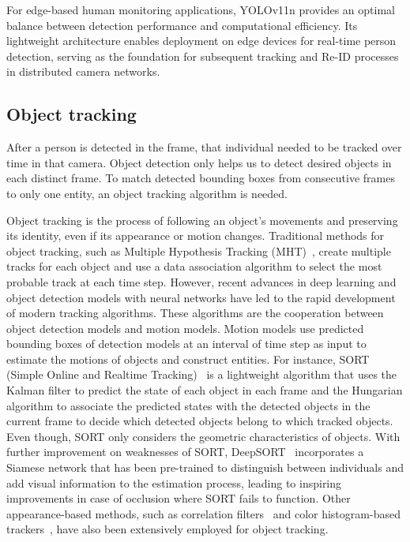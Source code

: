\documentclass[../main.tex]{subfiles}
\begin{document}
For edge-based human monitoring applications, YOLOv11n provides an optimal balance between detection performance and computational efficiency. Its lightweight architecture enables deployment on edge devices for real-time person detection, serving as the foundation for subsequent tracking and Re-ID processes in distributed camera networks.

\subsection{Object tracking}
\label{sec:objtrack}
After a person is detected in the frame, that individual needed to be tracked over time in that camera. Object detection only helps us to detect desired objects in each distinct frame. To match detected bounding boxes from consecutive frames to only one entity, an object tracking algorithm is needed.

Object tracking is the process of following an object's movements and preserving its identity, even if its appearance or motion changes. Traditional methods for object tracking, such as Multiple Hypothesis Tracking (MHT)~\cite{reid1979algorithm}, create multiple tracks for each object and use a data association algorithm to select the most probable track at each time step. However, recent advances in deep learning and object detection models with neural networks have led to the rapid development of modern tracking algorithms. These algorithms are the cooperation between object detection models and motion models. Motion models use predicted bounding boxes of detection models at an interval of time step as input to estimate the motions of objects and construct entities. For instance, SORT (Simple Online and Realtime Tracking)~\cite{bewley2016simple} is a lightweight algorithm that uses the Kalman filter to predict the state of each object in each frame and the Hungarian algorithm to associate the predicted states with the detected objects in the current frame to decide which detected objects belong to which tracked objects. Even though, SORT only considers the geometric characteristics of objects. With further improvement on weaknesses of SORT, DeepSORT~\cite{wojke2017simple} incorporates a Siamese network that has been pre-trained to distinguish between individuals and add visual information to the estimation process, leading to inspiring improvements in case of occlusion where SORT fails to function. Other appearance-based methods, such as correlation filters~\cite{mekkayil2018object, bolme2010visual} and color histogram-based trackers~\cite{verges2001object, zivkovic2004like}, have also been extensively employed for object tracking.
\end{document}

